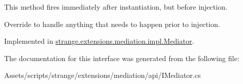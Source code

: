 This method fires immediately after instantiation, but before injection. 

Override to handle anything that needs to happen prior to injection. 

Implemented in \hyperlink{classstrange_1_1extensions_1_1mediation_1_1impl_1_1_mediator_a014246a5f07c3685e5d567700dd94d7a}{strange.\-extensions.\-mediation.\-impl.\-Mediator}.



The documentation for this interface was generated from the following file\-:\begin{DoxyCompactItemize}
\item 
Assets/scripts/strange/extensions/mediation/api/I\-Mediator.\-cs\end{DoxyCompactItemize}
